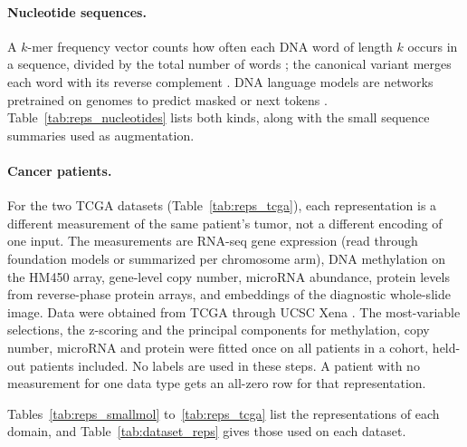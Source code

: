\paragraph{Nucleotide sequences.} A $k$-mer frequency vector counts how often each DNA word of length $k$ occurs in a sequence, divided by the total number of words \citep{Vinga2003}; the canonical variant merges each word with its reverse complement \citep{Teeling2004TETRA}. DNA language models are networks pretrained on genomes to predict masked or next tokens \citep{Zhou2023DNABERT2, DallaTorre2025, Nguyen2023HyenaDNA}. Table~\ref{tab:reps_nucleotides} lists both kinds, along with the small sequence summaries used as augmentation.

\paragraph{Cancer patients.} For the two TCGA datasets (Table~\ref{tab:reps_tcga}), each representation is a different measurement of the same patient's tumor, not a different encoding of one input. The measurements are RNA-seq gene expression (read through foundation models or summarized per chromosome arm), DNA methylation on the HM450 array, gene-level copy number, microRNA abundance, protein levels from reverse-phase protein arrays, and embeddings of the diagnostic whole-slide image. Data were obtained from TCGA through UCSC Xena \citep{TCGA2013, Goldman2020}. The most-variable selections, the z-scoring and the principal components for methylation, copy number, microRNA and protein were fitted once on all patients in a cohort, held-out patients included. No labels are used in these steps. A patient with no measurement for one data type gets an all-zero row for that representation.

Tables~\ref{tab:reps_smallmol} to~\ref{tab:reps_tcga} list the representations of each domain, and Table~\ref{tab:dataset_reps} gives those used on each dataset.

